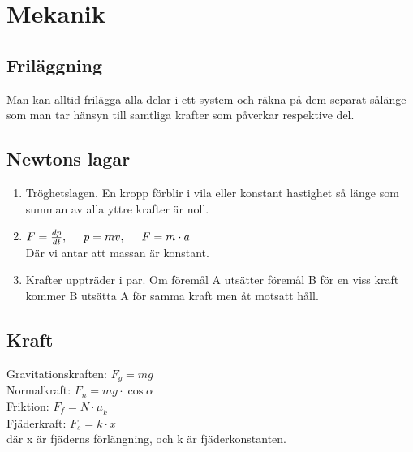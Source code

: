 \section{Mekanik}

\subsection{Friläggning}
Man kan alltid frilägga alla delar i ett system och räkna på dem separat sålänge som man tar hänsyn till samtliga krafter som påverkar respektive del.

\subsection{Newtons lagar}
\begin{enumerate}
    \item
        Tröghetslagen. En kropp förblir i vila eller konstant hastighet så länge som summan av alla yttre krafter är noll.
    \item
        \begin{math}
            F = \frac{dp}{dt}, \hspace*{0.5cm} p = mv, \hspace*{0.5cm} F = m \cdot a
        \end{math} \\[2pt]
        Där vi antar att massan är konstant.
    \item
        Krafter uppträder i par. Om föremål A utsätter föremål B för en viss kraft kommer B utsätta A för samma kraft men åt motsatt håll.
\end{enumerate}

\subsection{Kraft}
Gravitationskraften: 
\begin{math}
    F_g = mg
\end{math} \\[2pt]
Normalkraft:
\begin{math}
    F_n = mg \cdot \cos \alpha
\end{math} \\[2pt]
Friktion:
\begin{math}
    F_f = N \cdot \mu_k
\end{math} \\[2pt]
Fjäderkraft:
\begin{math}
    F_s = k \cdot x
\end{math} \\[2pt]
där x är fjäderns förlängning, och k är fjäderkonstanten.

